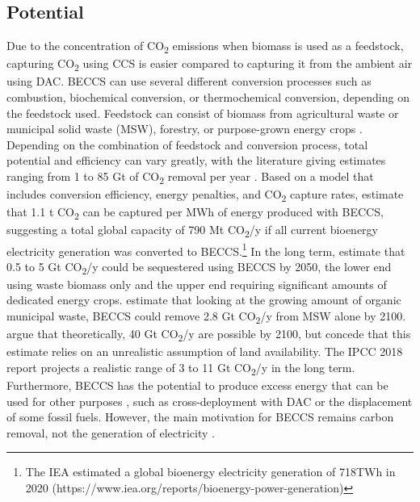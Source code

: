 \subsection*{Potential}
Due to the concentration of CO\textsubscript{2} emissions when biomass is used as a feedstock, capturing CO\textsubscript{2} using CCS is easier compared to capturing it from the ambient air using DAC. BECCS can use several different conversion processes such as combustion, biochemical conversion, or thermochemical conversion, depending on the feedstock used. Feedstock can consist of biomass from agricultural waste or municipal solid waste (MSW), forestry, or purpose-grown energy crops \parencite{Dipple2021TheSystems}. Depending on the combination of feedstock and conversion process, total potential and efficiency can vary greatly, with the literature giving estimates ranging from 1 to 85 Gt of CO\textsubscript{2} removal per year \parencite[342]{IPCC2018Global1.5C}.
Based on a model that includes conversion efficiency, energy penalties, and CO\textsubscript{2} capture rates, \textcite{Garcia-Freites2021TheTarget} estimate that 1.1 t CO\textsubscript{2} can be captured per MWh of energy produced with BECCS, suggesting a total global capacity of 790 Mt CO\textsubscript{2}/y if all current bioenergy electricity generation was converted to BECCS.\footnote{The IEA estimated a global bioenergy electricity generation of 718TWh in 2020 (https://www.iea.org/reports/bioenergy-power-generation)}
In the long term, \textcite{Fuss2018NegativeEffects} estimate that 0.5 to 5 Gt CO\textsubscript{2}/y could be sequestered using BECCS by 2050, the lower end using waste biomass only and the upper end requiring significant amounts of dedicated energy crops. \textcite{Pour2018PotentialBECCS} estimate that looking at the growing amount of organic municipal waste, BECCS could remove 2.8 Gt CO\textsubscript{2}/y from MSW alone by 2100. \textcite{Hanssen2020TheStorage} argue that theoretically, 40 Gt CO\textsubscript{2}/y are possible by 2100, but concede that this estimate relies on an unrealistic assumption of land availability.
The IPCC 2018 report projects a realistic range of 3 to 11 Gt CO\textsubscript{2}/y in the long term.
Furthermore, BECCS has the potential to produce excess energy that can be used for other purposes \parencite{Fajardy2017CanEmissions}, such as cross-deployment with DAC or the displacement of some fossil fuels. However, the main motivation for BECCS remains carbon removal, not the generation of electricity \parencite{Klein2014TheREMIND-MAgPIE}.
